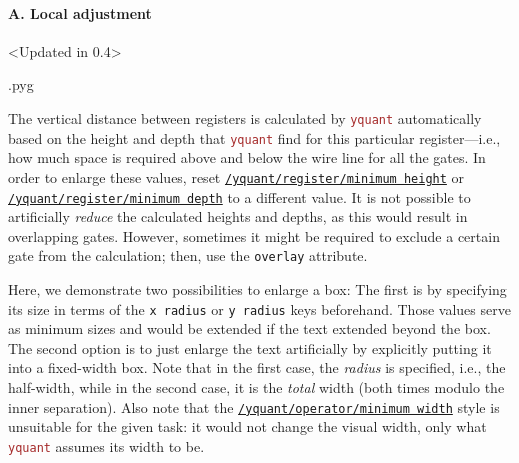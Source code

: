\documentclass{scrartcl}
\makeatletter
\newenvironment{codeexample}{%
   \VerbatimEnvironment%
   \let\FVB@VerbatimOut\minted@FVB@VerbatimOut
   \let\FVE@VerbatimOut\minted@FVE@VerbatimOut
   \minted@configlang{tex}%
   \minted@fvset
   \begin{VerbatimOut}[codes={\catcode`\^^I=12},firstline,lastline]{\minted@jobname.pyg}%
}{
   \end{VerbatimOut}%
   \minted@langlinenoson%
   \savebox\codeexamplebox{ \minted@jobname.pyg}%
   \ifdim\wd\codeexamplebox>\dimexpr.5\linewidth-3mm\relax%
      \wd\codeexamplebox=.5\linewidth%
   \else%
      \wd\codeexamplebox=\dimexpr\wd\codeexamplebox+3mm\relax%
   \fi%
   \noindent\begin{minipage}{\wd\codeexamplebox}%
      \centering%
      \usebox\codeexamplebox%
   \end{minipage}%
   \begin{minipage}{\dimexpr\linewidth-\wd\codeexamplebox\relax}%
      \expandafter\minted@pygmentize\expandafter{\minted@lang}%
   \end{minipage}%
   \minted@langlinenosoff%
   \par%
}
\newenvironment{codeexample*}{%
   \VerbatimEnvironment%
   \let\FVB@VerbatimOut\minted@FVB@VerbatimOut
   \let\FVE@VerbatimOut\minted@FVE@VerbatimOut
   \minted@configlang{tex}%
   \minted@fvset
   \begin{VerbatimOut}[codes={\catcode`\^^I=12},firstline,lastline]{\minted@jobname.pyg}%
}{
   \end{VerbatimOut}%
   \minted@langlinenoson%
   \begin{adjustbox}{center}
       \minted@jobname.pyg %
   \end{adjustbox}\nopagebreak
   \expandafter\minted@pygmentize\expandafter{\minted@lang}%
   \minted@langlinenosoff%
   \par%
}
\def\pkg#1{\textcolor{brown}{\texttt{#1}}}
\def\style#1{\hyperref[style:#1]{\texttt{#1}}}
\def\Yquant{\pkg{yquant}}
\makeatother
\begin{document}
            \paragraph{A. Local adjustment}\leavevmode
               \begin{example}<Updated in 0.4>
                  \begin{codeexample}
                  \end{codeexample}
                  The vertical distance between registers is calculated by \Yquant{} automatically based on the height and depth that \Yquant{} find for this particular register---i.e., how much space is required above and below the wire line for all the gates.
                  In order to enlarge these values, reset \style{/yquant/register/minimum height} or \style{/yquant/register/minimum depth} to a different value.
                  It is not possible to artificially \emph{reduce} the calculated heights and depths, as this would result in overlapping gates.
                  However, sometimes it might be required to exclude a certain gate from the calculation; then, use the \texttt{overlay} attribute.
               \end{example}

               \begin{example}
                  \begin{codeexample*}
                  \end{codeexample*}
                  Here, we demonstrate two possibilities to enlarge a box: The first is by specifying its size in terms of the \texttt{x radius} or \texttt{y radius} keys beforehand.
                  Those values serve as minimum sizes and would be extended if the text extended beyond the box.
                  The second option is to just enlarge the text artificially by explicitly putting it into a fixed\hyp width box.
                  Note that in the first case, the \emph{radius} is specified, i.e., the half\hyp width, while in the second case, it is the \emph{total} width (both times modulo the inner separation).
                  Also note that the \style{/yquant/operator/minimum width} style is unsuitable for the given task: it would not change the visual width, only what \Yquant{} assumes its width to be.
               \end{example}
\end{document}
